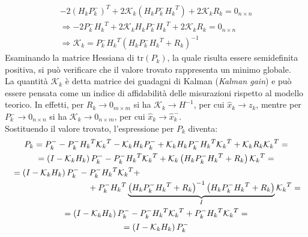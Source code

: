 \documentclass[12pt,a4paper,openright,twoside]{book}
\begin{document}
\begin{gather*}
-2(H_kP_k^-)^T+2\mathcal{K}_k\left(H_kP_k^-{H_k}^T\right)+2\mathcal{K}_kR_k=0_{n\times n} \\
\Rightarrow-2P_k^-{H_k}^T+2\mathcal{K}_kH_kP_k^-{H_k}^T+2\mathcal{K}_kR_k=0_{n\times n} \\
\Rightarrow\mathcal{K}_k=P_k^-{H_k}^T\left(H_kP_k^-{H_k}^T+R_k\right)^{-1}
\end{gather*}
Esaminando la matrice Hessiana di $\mathrm{tr}(P_k)$, la quale risulta essere semidefinita positiva, si può verificare che il valore trovato rappresenta un minimo globale. \\
La quantità $\mathcal{K}_k$ è detta matrice dei guadagni di Kalman (\textit{Kalman gain}) e può essere pensata come un indice di affidabilità delle misurazioni rispetto al modello teorico. In effetti, per $R_k\to 0_{m\times m}$ si ha $\mathcal{K}_k\to H^{-1}$, per cui $\hat{x}_k\to z_k$, mentre per $P_k^-\to 0_{n\times n}$ si ha $\mathcal{K}_k\to 0_{n\times m}$, per cui $\hat{x}_k\to \hat{x}_k^-$. \\

Sostituendo il valore trovato, l'espressione per $P_k$ diventa:
\begin{gather*}
P_k=P_k^--P_k^-{H_k}^T{\mathcal{K}_k}^T-\mathcal{K}_kH_kP_k^-+\mathcal{K}_kH_kP_k^-{H_k}^T{\mathcal{K}_k}^T+\mathcal{K}_kR_k{\mathcal{K}_k}^T= \\
=\left(I-\mathcal{K}_kH_k\right)P_k^--P_k^-{H_k}^T{\mathcal{K}_k}^T+\mathcal{K}_k\left(H_kP_k^-{H_k}^T+R_k\right){\mathcal{K}_k}^T= \\
\begin{multlined}[\textwidth]
=\left(I-\mathcal{K}_kH_k\right)P_k^--P_k^-{H_k}^T{\mathcal{K}_k}^T+ \\
+P_k^-{H_k}^T\underbrace{\left(H_kP_k^-{H_k}^T+R_k\right)^{-1}\left(H_kP_k^-{H_k}^T+R_k\right)}_{I}{\mathcal{K}_k}^T=
\end{multlined} \\
=\left(I-\mathcal{K}_kH_k\right)P_k^--P_k^-{H_k}^T{\mathcal{K}_k}^T+P_k^-{H_k}^T{\mathcal{K}_k}^T= \\
=\left(I-\mathcal{K}_kH_k\right)P_k^-
\end{gather*}
\end{document}

